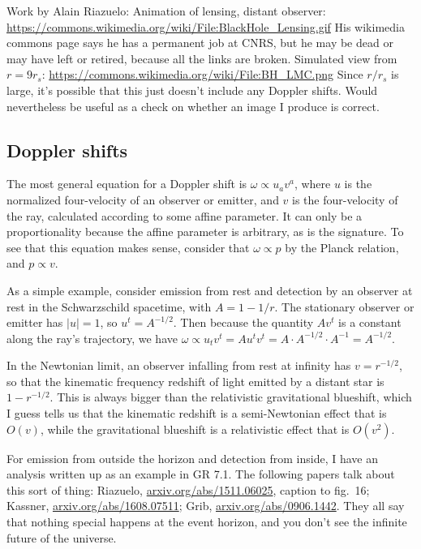 \documentclass{article}
\begin{document}
Work by Alain Riazuelo: Animation of lensing,
distant observer: \url{https://commons.wikimedia.org/wiki/File:BlackHole_Lensing.gif}
His wikimedia commons page says he has a permanent job at CNRS, but he may be dead or
may have left or retired, because all the links are broken.
Simulated view from $r=9r_s$: \url{https://commons.wikimedia.org/wiki/File:BH_LMC.png}
Since $r/r_s$ is large, it's possible that this just doesn't include any Doppler shifts.
Would nevertheless be useful as a check on whether an image I produce is correct.

\subsection{Doppler shifts}

The most general equation for a Doppler shift is $\omega \propto u_av^a$, where $u$ is the normalized
four-velocity of an observer or emitter, and $v$ is the four-velocity of the ray, calculated according
to some affine parameter. It can only be a proportionality because the affine parameter is arbitrary,
as is the signature. To see that this equation makes sense, consider that $\omega\propto p$ by
the Planck relation, and $p\propto v$.

As a simple example, consider emission from rest and detection
by an observer at rest in the Schwarzschild spacetime, with $A=1-1/r$.
The stationary observer or emitter has $|u|=1$, so $u^t=A^{-1/2}$.
Then because the quantity $Av^t$ is a constant along the ray's trajectory, we have
$\omega \propto u_t v^t = Au^t v^t = A\cdot A^{-1/2}\cdot A^{-1}=A^{-1/2}$.

In the Newtonian limit, an observer
infalling from rest at infinity has $v=r^{-1/2}$, so that the kinematic frequency redshift
of light emitted by a distant star is $1-r^{-1/2}$. This is
always bigger than the relativistic gravitational blueshift, which I guess tells us that
the kinematic redshift is a semi-Newtonian effect that is $O(v)$, while the gravitational blueshift is
a relativistic effect that is $O(v^2)$.

For emission from outside the horizon and
detection from inside, I have an analysis written up as an example
in GR 7.1.  The following papers talk about this sort of
thing: Riazuelo, \url{arxiv.org/abs/1511.06025}, caption to fig.~16;
Kassner, \url{arxiv.org/abs/1608.07511}; Grib,
\url{arxiv.org/abs/0906.1442}.  They all say that nothing special
happens at the event horizon, and you don't see the infinite future of
the universe.
\end{document}
